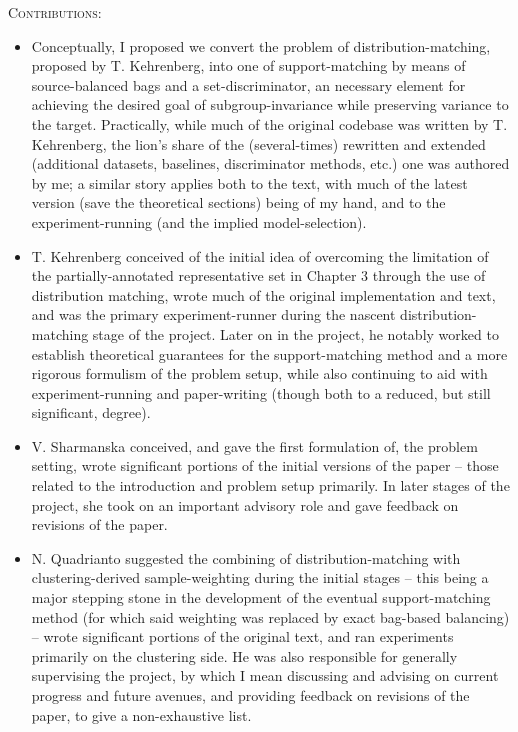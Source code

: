 \noindent\textsc{Contributions:}
%
\begin{itemize}
    \item 
        Conceptually, I proposed we convert the problem of distribution-matching, proposed by T.
        Kehrenberg, into one of support-matching by means of source-balanced bags and a
        set-discriminator, an necessary element for achieving the desired goal of
        subgroup-invariance while preserving variance to the target.
        Practically, while much of the original codebase was written by T. Kehrenberg, the lion's
        share of the (several-times) rewritten and extended (additional datasets, baselines,
        discriminator methods, etc.) one was authored by me; a similar story applies both to the
        text, with much of the latest version (save the theoretical sections) being of my hand, and
        to the experiment-running (and the implied model-selection).

    \item 
        T. Kehrenberg conceived of the initial idea of overcoming the limitation of the
        partially-annotated representative set in Chapter 3 through the use of distribution
        matching, wrote much of the original implementation and text, and was the primary
        experiment-runner during the nascent distribution-matching stage of the project.
        Later on in the project, he notably worked to establish theoretical guarantees
        for the support-matching method and a more rigorous formulism of the problem setup, while
        also continuing to aid with experiment-running and paper-writing (though both to a reduced,
        but still significant, degree).
    \item
        V. Sharmanska conceived, and gave the first formulation of, the problem setting, wrote
        significant portions of the initial versions of the paper -- those related to the
        introduction and problem setup primarily.
        In later stages of the project, she took on an important advisory role and gave
        feedback on revisions of the paper.
    \item 
        N. Quadrianto suggested the combining of distribution-matching with clustering-derived
        sample-weighting during the initial stages -- this being a major stepping stone in the
        development of the eventual support-matching method (for which said weighting was replaced
        by exact bag-based balancing) -- wrote significant portions of the original text, and ran
        experiments primarily on the clustering side.
        He was also responsible for generally supervising the project, by which I mean discussing
        and advising on current progress and future avenues, and providing feedback on revisions of
        the paper, to give a non-exhaustive list.
      
\end{itemize}
